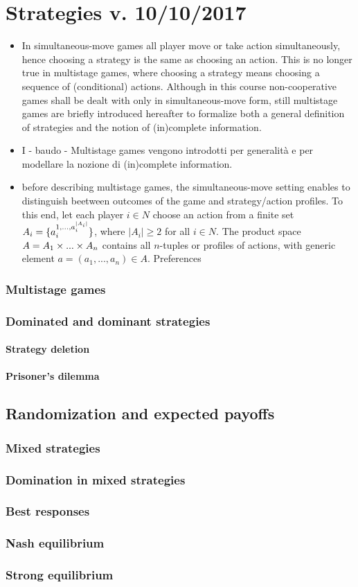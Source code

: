 \chapter{Strategies v. 10/10/2017}
\begin{itemize}
	\item In simultaneous-move games all player move or take action simultaneously, hence choosing a strategy is the same as choosing an action. This is no longer true in multistage games, where choosing a strategy means choosing a sequence of (conditional) actions. Although in this course non-cooperative games shall be dealt with only in simultaneous-move form, still multistage games are briefly introduced hereafter to formalize both a general definition of strategies and the notion of (in)complete information.
	\item I - baudo - Multistage games vengono introdotti per generalit\`a e per modellare la nozione di (in)complete information.
	\item before describing multistage games, the simultaneous-move setting enables to distinguish beetween outcomes of the game and strategy/action profiles. To this end, let each player $i \in N$ choose an action from a finite set $A_i = \{ a_{i}^{1, ..., a_{i}^{|A_i|}} \}$, where $|A_i| \ge 2$ for all $i \in N$. The product space $A = A_1 \times ... \times A_n$ contains all $n$-tuples or profiles of actions, with generic element $a = (a_1, ..., a_n) \in A$. Preferences  
\end{itemize}


\subsection{Multistage games}
\subsection{Dominated and dominant strategies}
\subsubsection{Strategy deletion}
\subsubsection{Prisoner's dilemma}

\section{Randomization and expected payoffs}
\subsection{Mixed strategies}
\subsection{Domination in mixed strategies}
\subsection{Best responses}
\subsection{Nash equilibrium}
\subsection{Strong equilibrium}